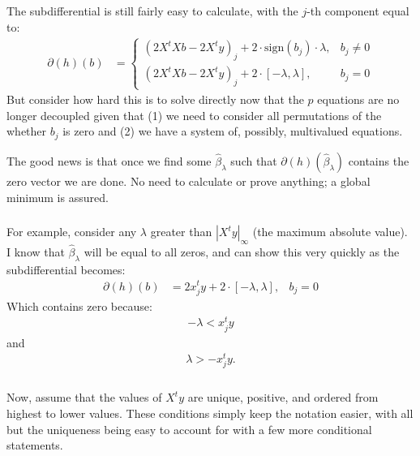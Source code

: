\begin{frame}[fragile] \frametitle{}

The subdifferential is still fairly easy to calculate,
with the $j$-th component equal to:
\begin{align*}
\partial(h)(b) &= \left\{ \begin{array}{ll}
\left(2 X^t X b - 2 X^t y\right)_{j} + 2\cdot \text{sign}(b_j)\cdot\lambda, & b_j \neq 0 \\[0pt]
\left(2 X^t X b - 2 X^t y\right)_{j} + 2\cdot [-\lambda,\lambda], &b_j = 0
\end{array} \right.
\end{align*}
\pause But consider how hard this is to solve directly now that the
$p$ equations are no longer decoupled given that (1) we need to consider
all permutations of the whether $b_j$ is zero and (2) we have a system
of, possibly, multivalued equations.

\pause The good news is that once we find some $\widehat{\beta}_\lambda$ such
that $\partial(h)(\widehat{\beta}_\lambda)$ contains the zero vector we are
done. No need to calculate or prove anything; a global minimum is assured.

\end{frame}


\begin{frame}[fragile] \frametitle{}

For example, consider any $\lambda$ greater than $|X^t y|_\infty$ (the
maximum absolute value). I know that $\widehat{\beta}_\lambda$ will be
equal to all zeros, and can show this very quickly as the subdifferential
becomes:
\begin{align*}
\partial(h)(b) &= 2 x_j^t y + 2\cdot[-\lambda,\lambda], &b_j = 0
\end{align*}
\pause Which contains zero because:
\begin{align*}
-\lambda < x_j^t y
\end{align*}
and
\begin{align*}
\lambda > -x_j^t y.
\end{align*}

\end{frame}


\begin{frame}[fragile] \frametitle{}

Now, assume that the values of $X^t y$ are unique, positive,
and ordered from highest to lower values. These conditions
simply keep the notation easier, with all but the uniqueness
being easy to account for with a few more conditional statements.

\end{frame}


